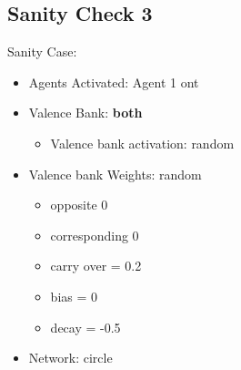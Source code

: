 \documentclass{article}\usepackage[]{graphicx}\usepackage[]{color}
\begin{document}
\subsection{Sanity Check 3}
\label{sec:sanity3}
Sanity Case:
\begin{itemize}
  \item Agents Activated: Agent 1 ont
  \item Valence Bank: \textbf{both}
  \begin{itemize}
      \item Valence bank activation: random
  \end{itemize}
  \item Valence bank Weights: random
  \begin{itemize}
      \item opposite 0
      \item corresponding 0
      \item carry over = 0.2
      \item bias = 0
      \item decay = -0.5
  \end{itemize}
  \item Network: circle
\end{itemize}
\end{document}
